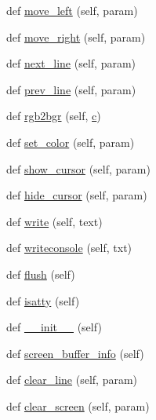 \begin{DoxyCompactItemize}
\item 
def \hyperlink{classwaflib_1_1ansiterm_1_1_ansi_term_a617dda0ced0a3e3f3443366d4a1c46bb}{move\+\_\+left} (self, param)
\item 
def \hyperlink{classwaflib_1_1ansiterm_1_1_ansi_term_a1388984c5cb5051d6c48682d1cd998b7}{move\+\_\+right} (self, param)
\item 
def \hyperlink{classwaflib_1_1ansiterm_1_1_ansi_term_a8ce79cf478dc1bf0cec2c12e28103522}{next\+\_\+line} (self, param)
\item 
def \hyperlink{classwaflib_1_1ansiterm_1_1_ansi_term_ac65f3453904e9c561f530b7c43e73f12}{prev\+\_\+line} (self, param)
\item 
def \hyperlink{classwaflib_1_1ansiterm_1_1_ansi_term_ad097d16ecb1babcef5970faccad1e7e9}{rgb2bgr} (self, \hyperlink{rfft2d_test_m_l_8m_ae0323a9039add2978bf5b49550572c7c}{c})
\item 
def \hyperlink{classwaflib_1_1ansiterm_1_1_ansi_term_a2b56ee3c8294f7e2e5bca7cc60e8ee05}{set\+\_\+color} (self, param)
\item 
def \hyperlink{classwaflib_1_1ansiterm_1_1_ansi_term_a594f6cf62d5e4ca33f2b88127fd6393d}{show\+\_\+cursor} (self, param)
\item 
def \hyperlink{classwaflib_1_1ansiterm_1_1_ansi_term_a2ca4bde33edd4afa92c8bda3f01d1dc9}{hide\+\_\+cursor} (self, param)
\item 
def \hyperlink{classwaflib_1_1ansiterm_1_1_ansi_term_a03ecdf1c9e54a69800aae320175c281b}{write} (self, text)
\item 
def \hyperlink{classwaflib_1_1ansiterm_1_1_ansi_term_a8296f875a3fd0a03fc109073f2a73a3e}{writeconsole} (self, txt)
\item 
def \hyperlink{classwaflib_1_1ansiterm_1_1_ansi_term_a08667242c11cdfd8b74d64f8191d4938}{flush} (self)
\item 
def \hyperlink{classwaflib_1_1ansiterm_1_1_ansi_term_a08e698612e76adc1aa3e26cdc5cb2009}{isatty} (self)
\item 
def \hyperlink{classwaflib_1_1ansiterm_1_1_ansi_term_ab397a7401f836bb9f96d9e54c6333821}{\+\_\+\+\_\+init\+\_\+\+\_\+} (self)
\item 
def \hyperlink{classwaflib_1_1ansiterm_1_1_ansi_term_afdb1bac8f2508bdf2279320b85286196}{screen\+\_\+buffer\+\_\+info} (self)
\item 
def \hyperlink{classwaflib_1_1ansiterm_1_1_ansi_term_ae9df276c42e0569ad63c20c19de62b93}{clear\+\_\+line} (self, param)
\item 
def \hyperlink{classwaflib_1_1ansiterm_1_1_ansi_term_aa94cc04f29c4c51e0013e5cb87c0fd07}{clear\+\_\+screen} (self, param)

\end{DoxyCompactItemize}
